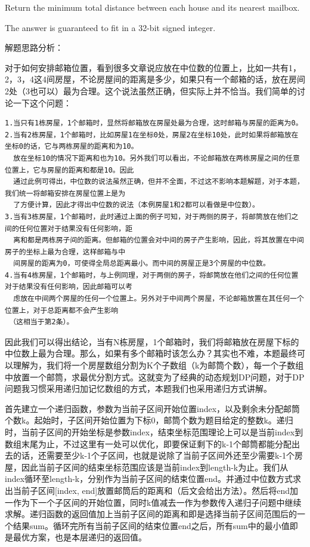 \documentclass[9pt, b5paaper]{book}
\begin{document}
Return the minimum total distance between each house and its nearest mailbox.

The answer is guaranteed to fit in a 32-bit signed integer.

解题思路分析：

对于如何安排邮箱位置，看到很多文章说应放在中位数的位置上，比如一共有1，2，3，4这4间房屋，不论房屋间的距离是多少，如果只有一个邮箱的话，放在房间2处（3也可以）最为合理。这个说法虽然正确，但实际上并不恰当。我们简单的讨论一下这个问题：
\begin{verbatim}
1.当只有1栋房屋，1个邮箱时，显然将邮箱放在房屋处最为合理，这时邮箱与房屋的距离为0。
2.当有2栋房屋，1个邮箱时，比如房屋1在坐标0处，房屋2在坐标10处，此时如果将邮箱放在坐标0的话，它与两栋房屋的距离和为10。
  放在坐标10的情况下距离和也为10。另外我们可以看出，不论邮箱放在两栋房屋之间的任意位置上，它与房屋的距离和都是10。因此
  通过此例可得出，中位数的说法虽然正确，但并不全面，不过这不影响本题解题，对于本题，我们统一将邮箱安排在房屋位置上是为
  了方便计算，因此才得出中位数的说法（本例房屋1和2都可以看做是中位数）。
3.当有3栋房屋，1个邮箱时，此时通过上面的例子可知，对于两侧的房子，将邮筒放在他们之间的任何位置对于结果没有任何影响，距
  离和都是两栋房子间的距离。但邮箱的位置会对中间的房子产生影响，因此，将其放置在中间房子的坐标上最为合理，这样邮箱与中
  间房屋的距离为0，可使得全局总距离最小。而中间的房屋正是3个房屋的中位数。
4.当有4栋房屋，1个邮箱时，与上例同理，对于两侧的房子，将邮筒放在他们之间的任何位置对于结果没有任何影响，因此邮箱可以考
  虑放在中间两个房屋的任何一个位置上。另外对于中间两个房屋，不论邮箱放置在其任何一个位置上，对于总距离都不会产生影响
 （这相当于第2条）。
\end{verbatim}

因此我们可以得出结论，当有N栋房屋，1个邮箱时，我们将邮箱放在房屋下标的中位数上最为合理。那么，如果有多个邮箱时该怎么办？其实也不难，本题最终可以理解为，我们将一个房屋数组分割为K个子数组（k为邮筒个数），每一个子数组中放置一个邮筒，求最优分割方式。这就变为了经典的动态规划DP问题，对于DP问题我习惯采用递归加记忆数组的方式，本题我们也采用递归方式讲解。

首先建立一个递归函数，参数为当前子区间开始位置index，以及剩余未分配邮筒个数k。起始时，子区间开始位置为下标0，邮筒个数为题目给定的整数k。递归时，当前子区间的开始坐标是参数index，结束坐标范围理论上可以是当前index到数组末尾为止，不过这里有一处可以优化，即要保证剩下的k-1个邮筒都能分配出去的话，还需要至少k-1个子区间，也就是说除了当前子区间外还至少需要k-1个房屋，因此当前子区间的结束坐标范围应该是当前index到length-k为止。我们从index循环至length-k，分别作为当前子区间的结束位置end。并通过中位数方式求出当前子区间[index, end]放置邮筒后的距离和（后文会给出方法）。然后将end加一作为下一个子区间的开始位置，同时k值减去一作为参数传入递归子问题中继续求解。递归函数的返回值加上当前子区间的距离和即是选择当前子区间范围后的一个结果sum。循环完所有当前子区间的结束位置end之后，所有sum中的最小值即是最优方案，也是本层递归的返回值。
\end{document}

